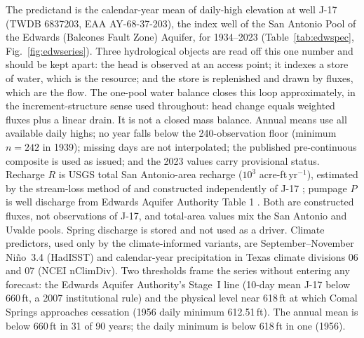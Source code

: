 \documentclass[preprint,11pt,authoryear]{elsarticle}
\theoremstyle{definition}
\theoremstyle{remark}
\begin{document}
The predictand is the calendar-year mean of daily-high elevation at well J-17 (TWDB 6837203, EAA AY-68-37-203), the index well of the San Antonio Pool of the Edwards (Balcones Fault Zone) Aquifer, for 1934--2023 (Table~\ref{tab:edwspec}, Fig.~\ref{fig:edwseries}). Three hydrological objects are read off this one number and should be kept apart: the head is observed at an access point; it indexes a store of water, which is the resource; and the store is replenished and drawn by fluxes, which are the flow. The one-pool water balance closes this loop approximately, in the increment-structure sense used throughout: head change equals weighted fluxes plus a linear drain. It is not a closed mass balance. Annual means use all available daily highs; no year falls below the 240-observation floor (minimum $n=242$ in 1939); missing days are not interpolated; the published pre-continuous composite is used as issued; and the 2023 values carry provisional status. Recharge $R$ is USGS total San Antonio-area recharge ($10^3$ acre-ft\,yr$^{-1}$), estimated by the stream-loss method of \citet{Puente1978} and constructed independently of J-17 \citep{UmphresChoi2025}; pumpage $P$ is well discharge from Edwards Aquifer Authority Table 1 \citep{EAA2024}. Both are constructed fluxes, not observations of J-17, and total-area values mix the San Antonio and Uvalde pools. Spring discharge is stored and not used as a driver. Climate predictors, used only by the climate-informed variants, are September--November Ni\~no~3.4 (HadISST) and calendar-year precipitation in Texas climate divisions 06 and 07 (NCEI nClimDiv). Two thresholds frame the series without entering any forecast: the Edwards Aquifer Authority's Stage~I line (10-day mean J-17 below 660\,ft, a 2007 institutional rule) and the physical level near 618\,ft at which Comal Springs approaches cessation (1956 daily minimum 612.51\,ft). The annual mean is below 660\,ft in 31 of 90 years; the daily minimum is below 618\,ft in one (1956).
\end{document}
